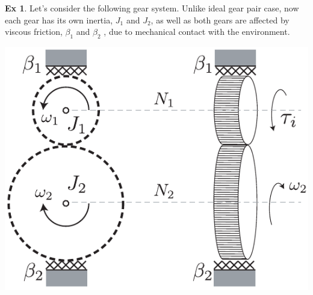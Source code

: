 \documentclass[twoside]{article}
\theoremstyle{definition}
\newtheorem{exmp}[theorem]{Ex}
\begin{document}
\vspace{12pt}

\begin{exmp} Let's consider the following gear system. Unlike ideal gear pair case, now each gear has its own inertia, $J_1$ and
$J_2$, as well as both gears are affected by viscous friction,
$\beta_1$ and $\beta_2$ , due to mechanical contact with the
environment. 
\end{exmp}

    \begin{center}
  \begin{minipage}[h]{0.75\linewidth}
    \begin{center}
      \includegraphics[width=1\textwidth]{ex2}
    \end{center}
  \end{minipage}
    \end{center}
\end{document}
